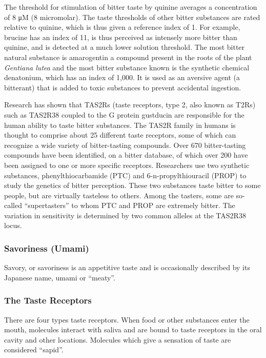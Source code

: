 The threshold for stimulation of bitter taste by quinine averages a
concentration of 8 μM (8 micromolar). The taste thresholds of other
bitter substances are rated relative to quinine, which is thus given a
reference index of 1. For example, brucine has an index of 11, is thus
perceived as intensely more bitter than quinine, and is detected at a
much lower solution threshold. The most bitter natural substance is
amarogentin a compound present in the roots of the plant \emph{Gentiana
lutea} and the most bitter substance known is the synthetic chemical
denatonium, which has an index of 1,000. It is used as an aversive agent
(a bitterant) that is added to toxic substances to prevent accidental
ingestion.

Research has shown that TAS2Rs (taste receptors, type 2, also known as
T2Rs) such as TAS2R38 coupled to the G protein gustducin are responsible
for the human ability to taste bitter substances. The TAS2R family in
humans is thought to comprise about 25 different taste receptors, some
of which can recognize a wide variety of bitter-tasting compounds. Over
670 bitter-tasting compounds have been identified, on a bitter database,
of which over 200 have been assigned to one or more specific receptors.
Researchers use two synthetic substances, phenylthiocarbamide (PTC) and
6-n-propylthiouracil (PROP) to study the genetics of bitter perception.
These two substances taste bitter to some people, but are virtually
tasteless to others. Among the tasters, some are so-called
``supertasters'' to whom PTC and PROP are extremely bitter. The
variation in sensitivity is determined by two common alleles at the
TAS2R38 locus.

\hypertarget{savoriness-umami}{%
\subsubsection{Savoriness (Umami)}\label{savoriness-umami}}

Savory, or savoriness is an appetitive taste and is occasionally
described by its Japanese name, umami or ``meaty''.

\hypertarget{the-taste-receptors}{%
\subsubsection{The Taste Receptors}\label{the-taste-receptors}}

There are four types taste receptors. When food or other substances
enter the mouth, molecules interact with saliva and are bound to taste
receptors in the oral cavity and other locations. Molecules which give a
sensation of taste are considered ``sapid''.

